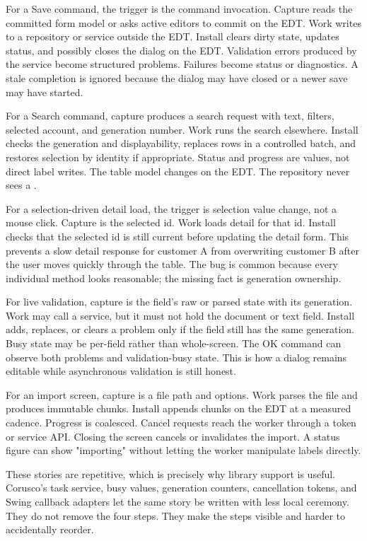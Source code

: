 For a Save command, the trigger is the command invocation. Capture reads the committed form model or asks active editors to commit on the EDT. Work writes to a repository or service outside the EDT. Install clears dirty state, updates status, and possibly closes the dialog on the EDT. Validation errors produced by the service become structured problems. Failures become status or diagnostics. A stale completion is ignored because the dialog may have closed or a newer save may have started.

For a Search command, capture produces a search request with text, filters, selected account, and generation number. Work runs the search elsewhere. Install checks the generation and displayability, replaces rows in a controlled batch, and restores selection by identity if appropriate. Status and progress are values, not direct label writes. The table model changes on the EDT. The repository never sees a .

For a selection-driven detail load, the trigger is selection value change, not a mouse click. Capture is the selected id. Work loads detail for that id. Install checks that the selected id is still current before updating the detail form. This prevents a slow detail response for customer A from overwriting customer B after the user moves quickly through the table. The bug is common because every individual method looks reasonable; the missing fact is generation ownership.

For live validation, capture is the field's raw or parsed state with its generation. Work may call a service, but it must not hold the document or text field. Install adds, replaces, or clears a problem only if the field still has the same generation. Busy state may be per-field rather than whole-screen. The OK command can observe both problems and validation-busy state. This is how a dialog remains editable while asynchronous validation is still honest.

For an import screen, capture is a file path and options. Work parses the file and produces immutable chunks. Install appends chunks on the EDT at a measured cadence. Progress is coalesced. Cancel requests reach the worker through a token or service API. Closing the screen cancels or invalidates the import. A status figure can show "importing" without letting the worker manipulate labels directly.

These stories are repetitive, which is precisely why library support is useful. Corusco's task service, busy values, generation counters, cancellation tokens, and Swing callback adapters let the same story be written with less local ceremony. They do not remove the four steps. They make the steps visible and harder to accidentally reorder.

